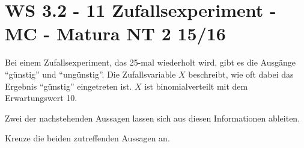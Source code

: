 \section{WS 3.2 - 11 Zufallsexperiment - MC - Matura NT 2 15/16}
\begin{beispiel}{0} %
Bei einem Zufallsexperiment, das 25-mal wiederholt wird, gibt es die Ausgänge "`günstig"' und
"`ungünstig"'. Die Zufallsvariable $X$ beschreibt, wie oft dabei das Ergebnis "`günstig"' eingetreten ist. $X$ ist binomialverteilt mit dem Erwartungswert 10.\leer

Zwei der nachstehenden Aussagen lassen sich aus diesen Informationen ableiten.

Kreuze die beiden zutreffenden Aussagen an. \leer

\end{beispiel}
